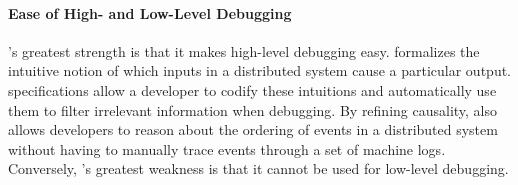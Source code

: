 \paragraph{Ease of High- and Low-Level Debugging}
\fluent{}'s greatest strength is that it makes high-level debugging easy.
\watprovenance{} formalizes the intuitive notion of which inputs in a
distributed system cause a particular output. \watprovenance{} specifications
allow a developer to codify these intuitions and automatically use them to
filter irrelevant information when debugging. By refining causality,
\watprovenance{} also allows developers to reason about the ordering of events
in a distributed system without having to manually trace events through a set
of machine logs. Conversely, \fluent{}'s greatest weakness is that it cannot be
used for low-level debugging.
